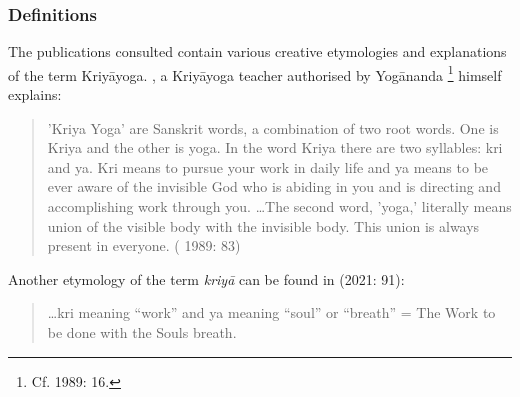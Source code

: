 \subsubsection{Definitions}

The publications consulted contain various creative etymologies and explanations of the term Kriyāyoga. \citeauthor{hariharananda1989}, a Kriyāyoga teacher authorised by Yogānanda \footnote{Cf. \citeauthor{hariharananda1989} 1989: 16.} himself explains: \begin{quote} 'Kriya Yoga' are Sanskrit words, a combination of two root words. One is Kriya and the other is yoga. In the word Kriya there are two syllables: kri and ya. Kri means to pursue your work in daily life and ya means to be ever aware of the invisible God who is abiding in you and is directing and accomplishing work through you. \ldots  The second word, 'yoga,' literally means union of the visible body with the invisible body. This union is always present in everyone. (\citeauthor{hariharananda1989} 1989: 83) \end{quote}
Another etymology of the term \textit{kriyā} can be found in \citeauthor{kriyayogalowenstein} (2021: 91): \begin{quote} \ldots kri meaning ``work'' and ya meaning ``soul'' or ``breath'' = The Work to be done with the Souls breath. \end{quote}
